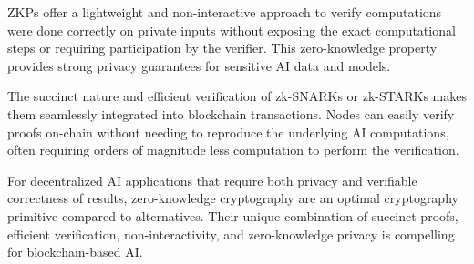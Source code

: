 \documentclass[conference]{IEEEtran}
\begin{document}
ZKPs offer a lightweight and non-interactive approach to verify computations were done correctly on private inputs without exposing the exact computational steps or requiring participation by the verifier. This zero-knowledge property provides strong privacy guarantees for sensitive AI data and models.

The succinct nature and efficient verification of zk-SNARKs or zk-STARKs makes them seamlessly integrated into blockchain transactions. Nodes can easily verify proofs on-chain without needing to reproduce the underlying AI computations, often requiring orders of magnitude less computation to perform the verification.

For decentralized AI applications that require both privacy and verifiable correctness of results, zero-knowledge cryptography are an optimal cryptography primitive compared to alternatives. Their unique combination of succinct proofs, efficient verification, non-interactivity, and zero-knowledge privacy is compelling for blockchain-based AI.
\end{document}
